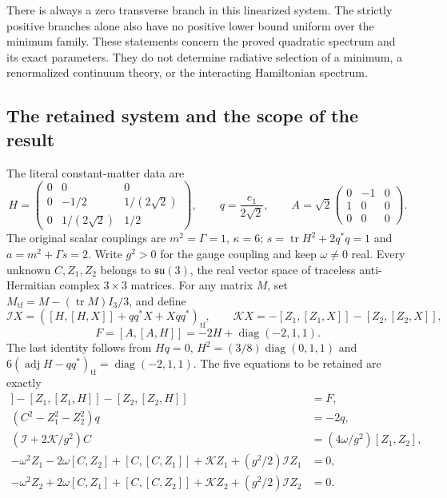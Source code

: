 There is always a zero transverse branch in this linearized system.
The strictly positive branches alone also have no positive lower bound
uniform over the minimum family. These statements concern the proved
quadratic spectrum and its exact parameters. They do not determine
radiative selection of a minimum, a renormalized continuum theory,
or the interacting Hamiltonian spectrum.

\subsection{The retained system and the scope of the result}

The literal constant-matter data are
\[
 H=\begin{pmatrix}0&0&0\\0&-1/2&1/(2\sqrt2)\\
 0&1/(2\sqrt2)&1/2\end{pmatrix},\qquad
 q=\frac{e_1}{2\sqrt2},\qquad
 A=\sqrt2\begin{pmatrix}0&-1&0\\1&0&0\\0&0&0\end{pmatrix}.
\]
The original scalar couplings are $m^2=\Gamma=1$, $\kappa=6$;
$s=\operatorname{tr} H^2+2q^*q=1$ and $a=m^2+\Gamma s=2$.
Write $g^2>0$ for the gauge coupling and keep $\omega\ne0$ real.
Every unknown $C,Z_1,Z_2$ belongs to $\mathfrak{su}(3)$, the real vector space
of traceless anti-Hermitian complex $3\times3$ matrices.
For any matrix $M$, set $M_{\mathrm{tf}}=M-(\operatorname{tr} M)I_3/3$, and define
\[
 \mathcal I X=([H,[H,X]]+qq^*X+Xqq^*)_{\mathrm{tf}},\qquad
 \mathcal KX=-[Z_1,[Z_1,X]]-[Z_2,[Z_2,X]],
\]
\[
 F=[A,[A,H]]=-2H+\operatorname{diag}(-2,1,1).
\]
The last identity follows from $Hq=0$,
$H^2=(3/8)\operatorname{diag}(0,1,1)$ and
$6(\operatorname{adj}H-qq^*)_{\mathrm{tf}}=\operatorname{diag}(-2,1,1)$.
The five equations to be retained are exactly
\begin{align}
 [C,[C,H]]-[Z_1,[Z_1,H]]-[Z_2,[Z_2,H]]&=F,\label{q444:cx:eq:phi}\\
 (C^2-Z_1^2-Z_2^2)q&=-2q,\label{q444:cx:eq:b}\\
 (\mathcal I+2\mathcal K/g^2)C&=(4\omega/g^2)[Z_1,Z_2],\label{q444:cx:eq:gauss}\\
 -\omega^2Z_1-2\omega[C,Z_2]+[C,[C,Z_1]]
             +\mathcal KZ_1+(g^2/2)\mathcal IZ_1&=0,\label{q444:cx:eq:sp1}\\
 -\omega^2Z_2+2\omega[C,Z_1]+[C,[C,Z_2]]
             +\mathcal KZ_2+(g^2/2)\mathcal IZ_2&=0.\label{q444:cx:eq:sp2}
\end{align}

